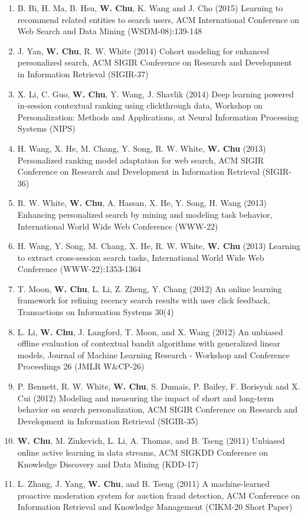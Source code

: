 \documentclass[line,10pt,final]{res}
\begin{document}
\begin{resume}
\begin{enumerate}
\item B. Bi, H. Ma, B. Hsu,  {\bf W. Chu}, K. Wang and J. Cho (2015) Learning to recommend related entities to search users, ACM International Conference on Web Search and Data Mining (WSDM-08):139-148  
\item J. Yan,  {\bf W. Chu}, R. W. White (2014) Cohort modeling for enhanced personalized search, ACM SIGIR Conference on Research and Development in Information Retrieval (SIGIR-37)  
\item X. Li, C. Guo,  {\bf W. Chu}, Y. Wang, J. Shavlik (2014) Deep learning powered in-session contextual ranking using clickthrough data, Workshop on Personalization: Methods and Applications, at Neural Information Processing Systems (NIPS)  
\item H. Wang, X. He, M. Chang, Y. Song, R. W. White,  {\bf W. Chu} (2013) Personalized ranking model adaptation for web search, ACM SIGIR Conference on Research and Development in Information Retrieval (SIGIR-36)  
\item R. W. White,  {\bf W. Chu}, A. Hassan, X. He, Y. Song, H. Wang (2013) Enhancing personalized search by mining and modeling task behavior, International World Wide Web Conference (WWW-22)  
\item H. Wang, Y. Song, M. Chang, X. He, R. W. White,  {\bf W. Chu} (2013) Learning to extract cross-session search tasks, International World Wide Web Conference (WWW-22):1353-1364  
\item T. Moon,  {\bf W. Chu}, L. Li, Z. Zheng, Y. Chang (2012) An online learning framework for refining recency search results with user click feedback, Transactions on Information Systems 30(4)  
\item L. Li,  {\bf W. Chu}, J. Langford, T. Moon, and X. Wang (2012) An unbiased offline evaluation of contextual bandit algorithms with generalized linear models, Journal of Machine Learning Research - Workshop and Conference Proceedings 26 (JMLR W\&CP-26)  
\item P. Bennett, R. W. White,  {\bf W. Chu}, S. Dumais, P. Bailey, F. Borisyuk and X. Cui (2012) Modeling and measuring the impact of short and long-term behavior on search personalization, ACM SIGIR Conference on Research and Development in Information Retrieval (SIGIR-35)  
\item  {\bf W. Chu}, M. Zinkevich, L. Li, A. Thomas, and B. Tseng (2011) Unbiased online active learning in data streams, ACM SIGKDD Conference on Knowledge Discovery and Data Mining (KDD-17)  
\item L. Zhang, J. Yang,  {\bf W. Chu}, and B. Tseng (2011) A machine-learned proactive moderation system for auction fraud detection, ACM Conference on Information Retrieval and Knowledge Management (CIKM-20 Short Paper)  

\end{enumerate}
\end{resume}
\end{document}
